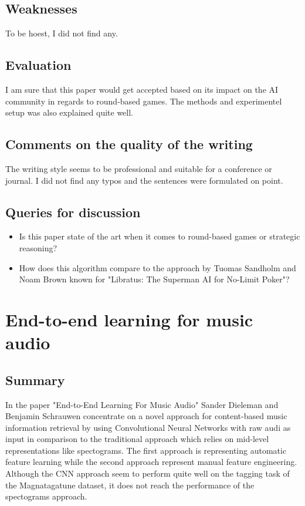 \documentclass[a4paper]{article}
\begin{document}
\subsection{Weaknesses}

To be hoest, I did not find any.

\subsection{Evaluation}

I am sure that this paper would get accepted based on its impact on the AI community in regards to round-based games. The methods and experimentel setup was also explained quite well.

\subsection{Comments on the quality of the writing}

The writing style seems to be professional and suitable for a conference or journal. I did not find any typos and the sentences were formulated on point.

\subsection{Queries for discussion}

\begin{itemize}
	\item Is this paper state of the art when it comes to round-based games or strategic reasoning?
	\item How does this algorithm compare to the approach by Tuomas Sandholm and Noam Brown known for "Libratus: The Superman AI for No-Limit Poker"?
\end{itemize}

\section{End-to-end learning for music audio}

\subsection{Summary}

In the paper "End-to-End Learning For Music Audio" Sander Dieleman and Benjamin Schrauwen concentrate on a novel approach for content-based music information retrieval by using Convolutional Neural Networks with raw audi as input in comparison to the traditional approach which relies on mid-level representations like spectograms. The first approach is representing automatic feature learning while the second approach represent manual feature engineering. Although the CNN approach seem to perform quite well on the tagging task of the Magnatagatune dataset, it does not reach the performance of the spectograms approach.
\end{document}
